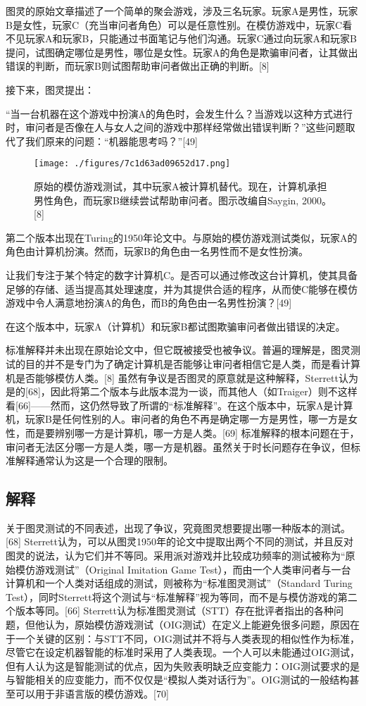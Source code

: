 图灵的原始文章描述了一个简单的聚会游戏，涉及三名玩家。玩家A是男性，玩家B是女性，玩家C（充当审问者角色）可以是任意性别。在模仿游戏中，玩家C看不见玩家A和玩家B，只能通过书面笔记与他们沟通。玩家C通过向玩家A和玩家B提问，试图确定哪位是男性，哪位是女性。玩家A的角色是欺骗审问者，让其做出错误的判断，而玩家B则试图帮助审问者做出正确的判断。[8]

接下来，图灵提出：

“当一台机器在这个游戏中扮演A的角色时，会发生什么？当游戏以这种方式进行时，审问者是否像在人与女人之间的游戏中那样经常做出错误判断？”这些问题取代了我们原来的问题：“机器能思考吗？”[49]
\begin{figure}[ht]
\centering
\texttt{[image: ./figures/7c1d63ad09652d17.png]}
\caption{原始的模仿游戏测试，其中玩家A被计算机替代。现在，计算机承担男性角色，而玩家B继续尝试帮助审问者。图示改编自Saygin, 2000。[8]} \label{fig_TLCS_3}
\end{figure}
第二个版本出现在Turing的1950年论文中。与原始的模仿游戏测试类似，玩家A的角色由计算机扮演。然而，玩家B的角色由一名男性而不是女性扮演。

让我们专注于某个特定的数字计算机C。是否可以通过修改这台计算机，使其具备足够的存储、适当提高其处理速度，并为其提供合适的程序，从而使C能够在模仿游戏中令人满意地扮演A的角色，而B的角色由一名男性扮演？[49]

在这个版本中，玩家A（计算机）和玩家B都试图欺骗审问者做出错误的决定。

标准解释并未出现在原始论文中，但它既被接受也被争议。普遍的理解是，图灵测试的目的并不是专门为了确定计算机是否能够让审问者相信它是人类，而是看计算机是否能够模仿人类。[8] 虽然有争议是否图灵的原意就是这种解释，Sterrett认为是的[68]，因此将第二个版本与此版本混为一谈，而其他人（如Traiger）则不这样看[66]——然而，这仍然导致了所谓的“标准解释”。在这个版本中，玩家A是计算机，玩家B是任何性别的人。审问者的角色不再是确定哪一方是男性，哪一方是女性，而是要辨别哪一方是计算机，哪一方是人类。[69] 标准解释的根本问题在于，审问者无法区分哪一方是人类，哪一方是机器。虽然关于时长问题存在争议，但标准解释通常认为这是一个合理的限制。
\subsection{解释}
关于图灵测试的不同表述，出现了争议，究竟图灵想要提出哪一种版本的测试。[68] Sterrett认为，可以从图灵1950年的论文中提取出两个不同的测试，并且反对图灵的说法，认为它们并不等同。采用派对游戏并比较成功频率的测试被称为“原始模仿游戏测试”（Original Imitation Game Test），而由一个人类审问者与一台计算机和一个人类对话组成的测试，则被称为“标准图灵测试”（Standard Turing Test），同时Sterrett将这个测试与“标准解释”视为等同，而不是与模仿游戏的第二个版本等同。[66] Sterrett认为标准图灵测试（STT）存在批评者指出的各种问题，但他认为，原始模仿游戏测试（OIG测试）在定义上能避免很多问题，原因在于一个关键的区别：与STT不同，OIG测试并不将与人类表现的相似性作为标准，尽管它在设定机器智能的标准时采用了人类表现。一个人可以未能通过OIG测试，但有人认为这是智能测试的优点，因为失败表明缺乏应变能力：OIG测试要求的是与智能相关的应变能力，而不仅仅是“模拟人类对话行为”。OIG测试的一般结构甚至可以用于非语言版的模仿游戏。[70]

